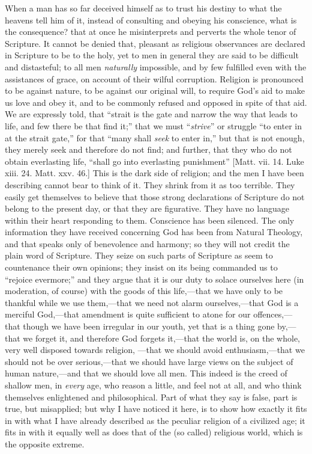 When a man has so far deceived himself as to trust his
destiny to what the heavens tell him of it, instead of
consulting and obeying his conscience, what is the
consequence? that at once he misinterprets and perverts
the whole tenor of Scripture. It cannot be denied that,
pleasant as religious observances are declared in
Scripture to be to the holy, yet to men in general they
are said to be difficult and distasteful; to all men \emph{naturally}
impossible, and by few fulfilled even with the
assistances of grace, on account of their wilful
corruption. Religion is pronounced to be against nature,
to be against our original will, to require God's aid to
make us love and obey it, and to be commonly refused and
opposed in spite of that aid. We are expressly told, that
``strait is the gate and narrow the way that leads to
life, and few there be that find it;'' that we must
``\emph{strive}'' or struggle ``to enter in
at the strait gate,'' for that ``many shall \emph{seek}
to enter in,'' but that is not enough, they merely
seek and therefore do not find; and further, that they
who do not obtain everlasting life, ``shall go into
everlasting punishment'' [Matt. vii. 14. Luke xiii.
24. Matt. xxv. 46.] This is the dark side of religion;
and the men I have been describing cannot bear to think
of it. They shrink from it as too terrible. They easily
get themselves to believe that those strong declarations
of Scripture do not belong to the present day, or that
they are figurative. They have no language within their
heart responding to them. Conscience has been silenced.
The only information they have received concerning God
has been from Natural Theology, and that speaks only of
benevolence and harmony; so they will not credit the
plain word of Scripture. They seize on such parts of
Scripture as seem to countenance their own opinions; they
insist on its being commanded us to ``rejoice
evermore;'' and they argue that it is our duty to
solace ourselves here (in moderation, of course) with the
goods of this life,—that we have only to be thankful
while we use them,—that we need not alarm
ourselves,—that God is a merciful God,—that
amendment is quite sufficient to atone for our
offences,—that though we have been irregular in our
youth, yet that is a thing gone by,—that we forget
it, and therefore God forgets it,—that the world is,
on the whole, very well disposed towards religion,
—that we should avoid enthusiasm,—that we
should not be over serious,—that we should have
large views on the subject of human nature,—and that
we should love all men. This indeed is the creed of
shallow men, in \emph{every} age, who reason a little,
and feel not at all, and who think themselves enlightened
and philosophical. Part of what they say is false, part
is true, but misapplied; but why I have noticed it here,
is to show how exactly it fits in with what I have
already described as the peculiar religion of a civilized
age; it fits in with it equally well as does that of the
(so called) religious world, which is the opposite
extreme.

